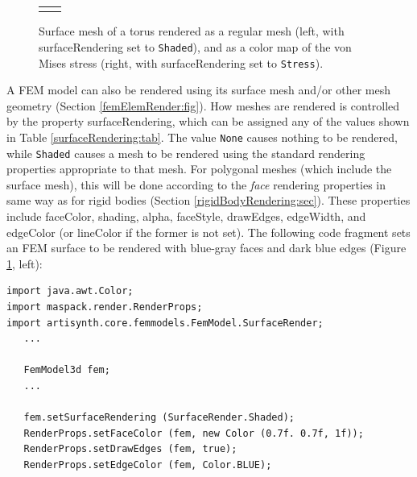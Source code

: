 \begin{figure}[h]
\begin{center}
\begin{tabular}{cc}
\fi
\end{tabular}
\end{center}
\caption{Surface mesh of a torus rendered as a regular
mesh (left, with {\sf surfaceRendering} set to {\tt Shaded}), and as a
color map of the von Mises stress (right, with {\sf surfaceRendering}
set to {\tt Stress}).}
\label{femSurfaceRender:fig} 
\end{figure}

A FEM model can also be rendered using its surface mesh and/or other
mesh geometry (Section \ref{femElemRender:fig}). How meshes are
rendered is controlled by the property {\sf surfaceRendering}, which
can be assigned any of the values shown in
Table \ref{surfaceRendering:tab}. The value {\tt None} causes nothing
to be rendered, while {\tt Shaded} causes a mesh to be rendered using
the standard rendering properties appropriate to that mesh. For
polygonal meshes (which include the surface mesh), this will be done
according to the {\it face} rendering properties in same way as for
rigid bodies (Section \ref{rigidBodyRendering:sec}). These properties
include {\sf faceColor}, {\sf shading}, {\sf alpha}, {\sf faceStyle},
{\sf drawEdges}, {\sf edgeWidth}, and {\sf edgeColor} (or {\sf
lineColor} if the former is not set). The following code
fragment sets an FEM surface to be rendered with blue-gray
faces and dark blue edges (Figure \ref{femSurfaceRender:fig}, left):
\pdfbreak
%
\begin{lstlisting}[]
import java.awt.Color;
import maspack.render.RenderProps;
import artisynth.core.femmodels.FemModel.SurfaceRender;
   ...

   FemModel3d fem;
   ...

   fem.setSurfaceRendering (SurfaceRender.Shaded);
   RenderProps.setFaceColor (fem, new Color (0.7f. 0.7f, 1f));
   RenderProps.setDrawEdges (fem, true);
   RenderProps.setEdgeColor (fem, Color.BLUE);
\end{lstlisting}
%
